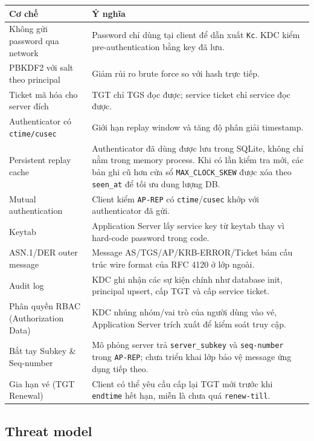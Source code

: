 \documentclass[12pt]{article}
\begin{document}
\begin{table}[H]
\centering
\renewcommand{\arraystretch}{1.25}
\begin{tabularx}{\textwidth}{|p{5cm}|X|}
\hline
\textbf{Cơ chế} & \textbf{Ý nghĩa} \\
\hline
Không gửi password qua network & Password chỉ dùng tại client để dẫn xuất \texttt{Kc}. KDC kiểm pre-authentication bằng key đã lưu. \\
\hline
PBKDF2 với salt theo principal & Giảm rủi ro brute force so với hash trực tiếp. \\
\hline
Ticket mã hóa cho server đích & TGT chỉ TGS đọc được; service ticket chỉ service đọc được. \\
\hline
Authenticator có \texttt{ctime/cusec} & Giới hạn replay window và tăng độ phân giải timestamp. \\
\hline
Persistent replay cache & Authenticator đã dùng được lưu trong SQLite, không chỉ nằm trong memory process. Khi có lần kiểm tra mới, các bản ghi cũ hơn cửa sổ \texttt{MAX\_CLOCK\_SKEW} được xóa theo \texttt{seen\_at} để tối ưu dung lượng DB. \\
\hline
Mutual authentication & Client kiểm \texttt{AP-REP} có \texttt{ctime}/\texttt{cusec} khớp với authenticator đã gửi. \\
\hline
Keytab & Application Server lấy service key từ keytab thay vì hard-code password trong code. \\
\hline
ASN.1/DER outer message & Message AS/TGS/AP/KRB-ERROR/Ticket bám cấu trúc wire format của RFC 4120 ở lớp ngoài. \\
\hline
Audit log & KDC ghi nhận các sự kiện chính như database init, principal upsert, cấp TGT và cấp service ticket. \\
\hline
Phân quyền RBAC (Authorization Data) & KDC nhúng nhóm/vai trò của người dùng vào vé, Application Server trích xuất để kiểm soát truy cập. \\
\hline
Bắt tay Subkey \& Seq-number & Mô phỏng server trả \texttt{server\_subkey} và \texttt{seq-number} trong \texttt{AP-REP}; chưa triển khai lớp bảo vệ message ứng dụng tiếp theo. \\
\hline
Gia hạn vé (TGT Renewal) & Client có thể yêu cầu cấp lại TGT mới trước khi \texttt{endtime} hết hạn, miễn là chưa quá \texttt{renew-till}. \\
\hline
\end{tabularx}
\end{table}

\subsection{Threat model}
\end{document}
